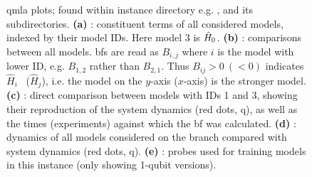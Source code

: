 \begin{figure}[H]
\begin{center}
{            \label{fig:qmla_bayes_factor_comparison}
        }
        \qquad
        \qquad
    \end{center}
    \caption[\Gls{instance} plots]{
        \gls{qmla} plots; found within instance directory e.g. , 
        and its subdirectories. 
        \textbf{(a)} : constituent terms of all considered models, indexed by their model IDs.
        Here model 3 is $\hat{H}_0$. 
        \textbf{(b)} :  comparisons between all models. 
        \glspl{bf} are read as $B_{i,j}$ where $i$ is the model with lower ID, 
            e.g. $B_{1,2}$ rather than $B_{2,1}$. 
            Thus $B_{ij} > 0 \ (<0)$ indicates $\hat{H}_i$ \ ($\hat{H}_j$), i.e. the model on the $y$-axis ($x$-axis) 
            is the stronger model.
        \textbf{(c)} : direct comparison between models with IDs 1 and 3, 
            showing their reproduction of the system dynamics (red dots, \gls{q}), 
            as well as the times (experiments) against which the \gls{bf} was calculated. 
        \textbf{(d)} : dynamics of all models considered on the branch
        compared with system dynamics (red dots, \gls{q}). 
        \textbf{(e)} : probes used for training models in this \gls{instance} (only showing 1-qubit versions).
    }
    \label{fig:instance_plots}
\end{figure}

